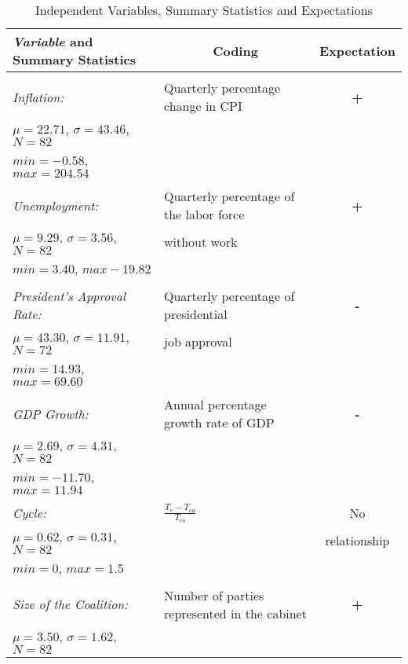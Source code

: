 \documentclass[12pt,a4paper]{article}
\begin{document}
\begin{table}[!htbp] \centering 
	\footnotesize
  \caption{Independent Variables, Summary Statistics and Expectations} 
  \label{descriptive} 
\begin{tabular}{llc} 
\hline\hline 
\multicolumn{1}{l}{\emph{Variable} and Summary Statistics}  & \multicolumn{1}{c}{Coding} & \multicolumn{1}{c}{Expectation} \\ 
\hline \\[-1.8ex]
\emph{Inflation:} & Quarterly percentage change in CPI & \textbf{+} \\
$\mu=22.71$, $\sigma=43.46$, $N=82$ &&\\
$min=-0.58$, $max=204.54$ &&\\
\\
\emph{Unemployment:}  & Quarterly percentage of the labor force  & \textbf{+} \\
$\mu=9.29$, $\sigma=3.56$, $N=82$ & without work &\\
$min=3.40$, $max-19.82$ &&\\
\\
\emph{President's Approval Rate:}  & Quarterly percentage of presidential  & \textbf{-} \\
$\mu=43.30$, $\sigma=11.91$, $N=72$ & job approval &\\
$min=14.93$, $max=69.60$ &&\\
\\
\emph{GDP Growth:}  & Annual percentage growth rate of GDP & \textbf{-} \\
$\mu=2.69$, $\sigma=4.31$, $N=82$ &&\\
$min=-11.70$, $max=11.94$ &&\\
\\
\emph{Cycle:}  & $\frac{T_{e} - T_{ca}}{T_{co}}$  & No \\
$\mu=0.62$, $\sigma=0.31$, $N=82$ && relationship\\
$min=0$, $max=1.5$ &&\\
\\
\emph{Size of the Coalition:}  & Number of parties represented in the cabinet  & \textbf{+} \\
$\mu=3.50$, $\sigma=1.62$, $N=82$ &&\\

\end{tabular}
\end{table}
\end{document}
